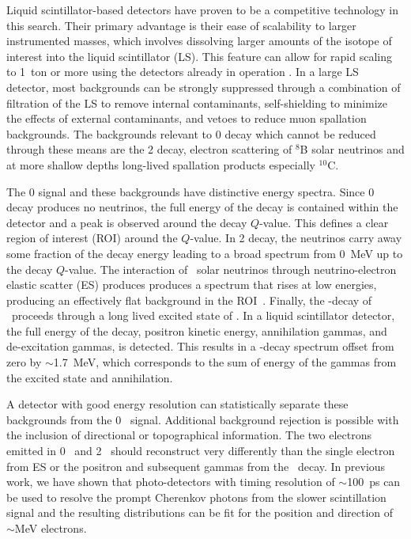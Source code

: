 Liquid scintillator-based detectors have
proven to be a competitive technology in this search\cite{KamLANDZen2013}. Their primary advantage is their ease of scalability to
larger instrumented masses, which involves dissolving larger amounts of
the isotope of interest into the liquid scintillator (LS). This
feature can allow for rapid scaling to 1~ton or more using the
detectors already in operation \cite{Biller2013}. In a large LS
detector, most backgrounds can be strongly suppressed through a
combination of filtration of the LS to remove internal contaminants,
self-shielding to minimize the effects of external contaminants, and
vetoes to reduce muon spallation backgrounds. The backgrounds relevant to
0{\nbb} decay which cannot be reduced through these means are the
2{\nbb} decay, electron scattering of $^8$B solar neutrinos and at more shallow depths long-lived spallation products especially $^{10}$C.



The 0{\nbb} signal and these backgrounds have distinctive energy spectra. Since 0{\nbb} decay produces no neutrinos, the full energy of the
decay is contained within the detector and a peak is observed around the decay $Q$-value. This defines a clear region of interest (ROI) around 
the $Q$-value. In 2{\nbb} decay, the neutrinos carry away some fraction of the decay energy leading to a broad spectrum from 0~MeV up to the 
decay $Q$-value. The interaction of \B~solar neutrinos through neutrino-electron elastic scatter (ES) produces produces a spectrum that rises 
at low energies, producing an effectively flat background in the ROI~\cite{SNOp-B8-bkg}. Finally, the \bpd-decay of \C~proceeds through a 
long lived excited state of \Bten. In a liquid scintillator detector, the full energy of the decay, positron kinetic energy, annihilation 
gammas, and de-excitation gammas, is detected. This results in a \bmd-decay spectrum offset from zero by $\sim$1.7~MeV, which corresponds
to the sum of energy of the gammas from the excited state and annihilation.

A detector with good energy resolution can statistically separate these backgrounds from the 0\nbb~ signal. Additional background rejection is possible with the inclusion of directional or topographical information. The two electrons emitted in 0\nbb~ and 2\nbb~ should reconstruct very differently than the single electron from ES or the positron and subsequent  gammas from the \C~decay. In previous work, we have shown that photo-detectors with timing resolution of $\sim$100~ps can be used to resolve the prompt Cherenkov photons from the slower scintillation signal and the resulting distributions can be fit for the position and direction of $\sim$MeV electrons\cite{Aberle2014}. 

